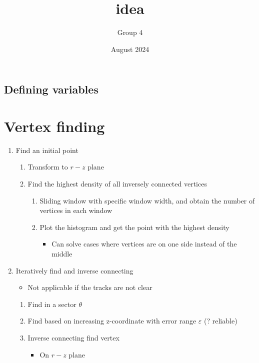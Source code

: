 \documentclass{article}
\title{idea}
\author{Group 4}
\date{August 2024}
\begin{document}
\maketitle

\subsection{Defining variables}


\section{Vertex finding}
\begin{enumerate}
  \item Find an initial point
    \begin{enumerate}
      \item Transform to $r-z$ plane
      \item Find the highest density of all inversely connected vertices
        \begin{enumerate}
          \item Sliding window with specific window width, and obtain the number of vertices in each window
          \item Plot the histogram and get the point with the highest density
            \begin{itemize}
              \item Can solve cases where vertices are on one side instead of the middle
            \end{itemize}
        \end{enumerate}
    \end{enumerate}
  
  \item Iteratively find and inverse connecting
    \begin{itemize}
      \item Not applicable if the tracks are not clear
    \end{itemize}
    \begin{enumerate}
      \item Find in a sector $\theta$
      \item Find based on increasing z-coordinate with error range $\varepsilon$ (? reliable)
      \item Inverse connecting find vertex
        \begin{itemize}
          \item On $r-z$ plane
        \end{itemize}
    \end{enumerate}
\end{enumerate}
\end{document}
